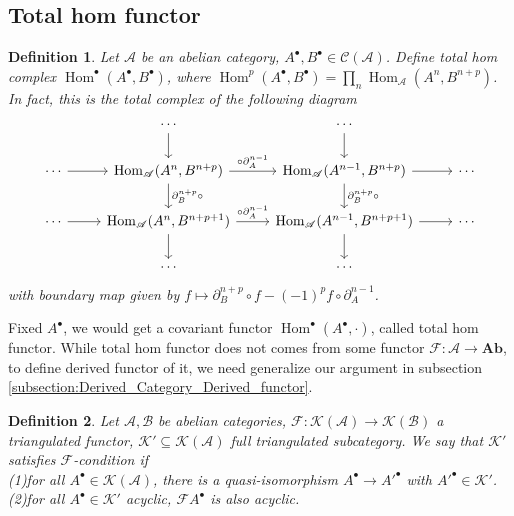 \documentclass{ctexart}
\newtheorem{definition}{Definition}[section]
\renewcommand{\hom}{\operatorname{Hom}}
\newcommand{\abeliangroups}{\mathbf{Ab}}
\begin{document}
\subsection{Total hom functor}
\label{subsection:Derived_Category_Total_hom_functor}

\begin{definition}
    Let $\mathscr{A}$ be an abelian category, $A^{\bullet},B^{\bullet}\in \mathcal{C}(\mathscr{A})$.
    Define total hom complex $\hom^{\bullet}(A^{\bullet}, B^{\bullet})$, where $\hom^{p}(A^{\bullet}, B^{\bullet}) = \prod_{n} \hom_{\mathscr{A}}(A^{n}, B^{n + p})$.
    In fact, this is the total complex of the following diagram
    \begin{equation}
        \begin{tikzcd}
            & \cdots \arrow[d] &
            \cdots \arrow[d] & \\ 
            \cdots \arrow[r] &
            \hom_{\mathscr{A}}(A^{n}, B^{n + p}) \arrow[r, "\circ \partial_{A}^{n - 1}"] \arrow[d, "\partial_{B}^{n + p} \circ"] &
            \hom_{\mathscr{A}}(A^{n - 1}, B^{n + p}) \arrow[r] \arrow[d, "\partial_{B}^{n + p} \circ"] &
            \cdots \\
            \cdots \arrow[r] &
            \hom_{\mathscr{A}}(A^{n}, B^{n + p + 1}) \arrow[r, "\circ \partial_{A}^{n - 1}"] \arrow[d] &
            \hom_{\mathscr{A}}(A^{n - 1}, B^{n + p + 1}) \arrow[r] \arrow[d] &
            \cdots \\
            & \cdots &
            \cdots &
        \end{tikzcd}
    \end{equation}
    with boundary map given by $f \mapsto \partial_{B}^{n + p} \circ f - (-1)^{p}f \circ \partial_{A}^{n - 1}$.
\end{definition}
Fixed $A^{\bullet}$, we would get a covariant functor $\hom^{\bullet}(A^{\bullet}, \cdot)$, called total hom functor.
While total hom functor does not comes from some functor $\mathcal{F}: \mathscr{A} \rightarrow \abeliangroups$,
to define derived functor of it, we need generalize our argument in subsection \ref{subsection:Derived_Category_Derived_functor}.
\begin{definition}
    Let $\mathscr{A}, \mathscr{B}$ be abelian categories, $\mathcal{F}: \mathcal{K}(\mathscr{A}) \rightarrow \mathcal{K}(\mathscr{B})$ a triangulated functor, $\mathcal{K}' \subseteq \mathcal{K}(\mathscr{A})$ full triangulated subcategory.
    We say that $\mathcal{K}'$ satisfies $\mathcal{F}$-condition if \\
    (1)for all $A^{\bullet}\in \mathcal{K}(\mathscr{A})$, there is a quasi-isomorphism $A^{\bullet} \rightarrow A'^{\bullet}$ with $A'^{\bullet}\in \mathcal{K}'$. \\
    (2)for all $A^{\bullet}\in \mathcal{K}'$ acyclic, $\mathcal{F}A^{\bullet}$ is also acyclic.
\end{definition}
\end{document}
